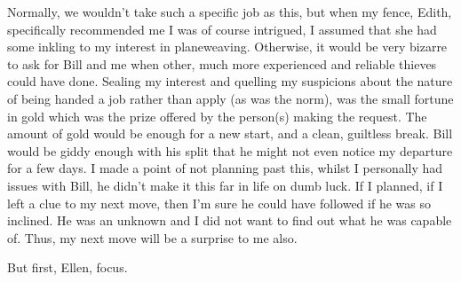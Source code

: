 Normally, we wouldn't take such a specific job as this, but when my fence,
Edith, specifically recommended me I was of course intrigued, I assumed that she
had some inkling to my interest in planeweaving. Otherwise, it would be very
bizarre to ask for Bill and me when other, much more experienced and reliable
thieves could have done. Sealing my
interest and quelling my suspicions about the nature of being handed a job
rather than apply (as was the norm), was the small fortune in gold which was the
prize offered by the person(s) making the request. The amount of gold would be enough for a new
start, and a clean, guiltless break. Bill would be giddy enough with his split
that he might not even notice my departure for a few days. I made a point of not
planning past this, whilst I personally had issues with Bill, he didn't make it
this far in life on dumb luck. If I planned, if I left a clue to my next move,
then I'm sure he could have followed if he was so inclined. He was an unknown
and I did not want to find out what he was capable of. Thus, my next move will
be a surprise to me also. 

But first, Ellen, focus. 








